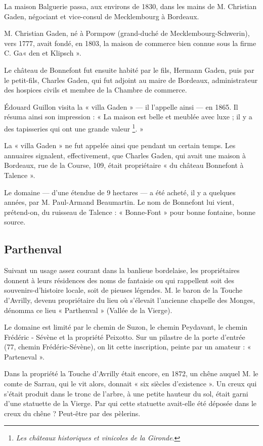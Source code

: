 La maison Balguerie passa, aux environs de 1830, dans les mains de M. Christian Gaden, négociant et vice-consul de Mecklembourg à Bordeaux.

M. Christian Gaden, né à Pormpow (grand-duché de Mecklembourg-Schwerin), vers 1777, avait fondé, en 1803, la maison de commerce bien connue sous la firme C. Ga« den et Klipsch ».

Le château de Bonnefont fut ensuite habité par le fils, Hermann Gaden, puis par le petit-fils, Charles Gaden, qui fut adjoint au maire de Bordeaux, administrateur des hospices civils et membre de la Chambre de commerce.

Édouard Guillon visita la « villa Gaden » — il l'appelle ainsi — en 1865. Il résuma ainsi son impression : « La maison est belle et meublée avec luxe ; il y a des tapisseries qui ont une grande valeur \footnote{\textit{Les châteaux historiques et vinicoles de la Gironde}.}. »

La « villa Gaden » ne fut appelée ainsi que pendant un certain temps. Les annuaires signalent, effectivement, que Charles Gaden, qui avait une maison à Bordeaux, rue de la Course, 109, était propriétaire « du château Bonnefont à Talence ».

Le domaine — d'une étendue de 9 hectares — a été acheté, il y a quelques années, par M. Paul-Armand Beaumartin. Le nom de Bonnefont lui vient, prétend-on, du ruisseau de Talence : « Bonne-Font » pour bonne fontaine, bonne source.

\subsection{Parthenval}

Suivant un usage assez courant dans la banlieue bordelaise, les propriétaires donnent à leurs résidences des noms de fantaisie ou qui rappellent soit des souvenirs-d'histoire locale, soit de pieuses légendes. M. le baron de la Touche d'Avrilly, devenu propriétaire du lieu où s'élevait l'ancienne chapelle des Monges, dénomma ce lieu « Parthenval » (Vallée de la Vierge).

Le domaine est limité par le chemin de Suzon, le chemin Peydavant, le chemin Frédéric - Sévène et la propriété Peixotto. Sur un pilastre de la porte d'entrée (77, chemin Frédéric-Sévène), on lit cette inscription, peinte par un amateur : « Parteneval ».

Dans la propriété la Touche d'Avrilly était encore, en 1872, un chêne auquel M. le comte de Sarrau, qui le vit alors, donnait « six siècles d'existence ». Un creux qui s'était produit dans le tronc de l'arbre, à une petite hauteur du sol, était garni d'une statuette de la Vierge. Par qui cette statuette avait-elle été déposée dans le creux du chêne ? Peut-être par des pèlerins.

